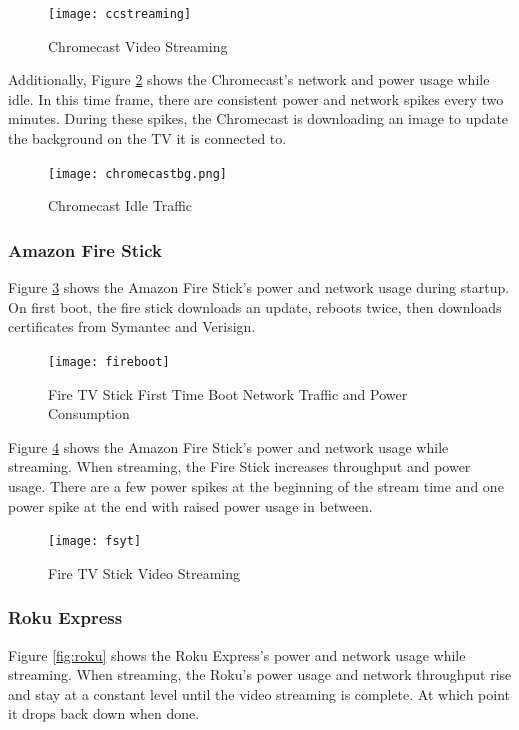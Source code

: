 \begin{figure}[H]
  \centering
  \texttt{[image: ccstreaming]}
  \caption{Chromecast Video Streaming}
  \label{fig:ccstream}
\end{figure}

Additionally, Figure \ref{fig:ccbg} shows the Chromecast's network and power usage while idle. In this time frame, there are consistent power and network spikes every two minutes. During these spikes, the Chromecast is downloading an image to update the background on the TV it is connected to.

\begin{figure}[H]
  \centering
  \texttt{[image: chromecastbg.png]}
  \caption{Chromecast Idle Traffic}
  \label{fig:ccbg}
\end{figure}

\subsubsection{Amazon Fire Stick}
Figure \ref{fig:fireboth} shows the Amazon Fire Stick's power and network usage during startup. On first boot, the fire stick downloads an update, reboots twice, then downloads certificates from Symantec and Verisign.

\begin{figure}[H]
  \centering
  \texttt{[image: fireboot]}
  \caption{Fire TV Stick First Time Boot Network Traffic and Power Consumption}
  \label{fig:fireboth}
\end{figure}

Figure \ref{fig:fsyt} shows the Amazon Fire Stick's power and network usage while streaming. When streaming, the Fire Stick increases throughput and power usage. There are a few power spikes at the beginning of the stream time and one power spike at the end with raised power usage in between.

\begin{figure}[H]
  \centering
  \texttt{[image: fsyt]}
  \caption{Fire TV Stick Video Streaming}
  \label{fig:fsyt}
\end{figure}

\subsubsection{Roku Express}
Figure \ref{fig:roku} shows the Roku Express's power and network usage while streaming. When streaming, the Roku's power usage and network throughput rise and stay at a constant level until the video streaming is complete. At which point it drops back down when done.

